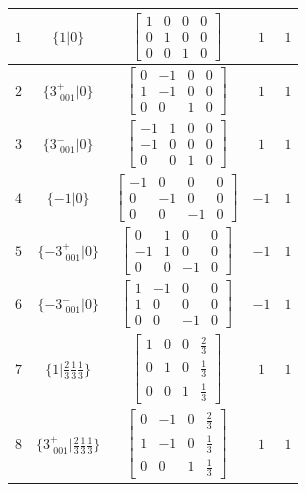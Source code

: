 \documentclass[fleqn,8pt]{jsarticle}
\begin{document}
\begin{longtable}{ccccc}
$ 1 $ & $ \{1|0\} $ & $ \begin{bmatrix} 1 & 0 & 0 & 0 \\ 0 & 1 & 0 & 0 \\ 0 & 0 & 1 & 0 \end{bmatrix} $ & $ 1 $ & $ 1 $ \\ \hline
$ 2 $ & $ \{3^{+}_{\,\,001}|0\} $ & $ \begin{bmatrix} 0 & -1 & 0 & 0 \\ 1 & -1 & 0 & 0 \\ 0 & 0 & 1 & 0 \end{bmatrix} $ & $ 1 $ & $ 1 $ \\ \hline
$ 3 $ & $ \{3^{-}_{\,\,001}|0\} $ & $ \begin{bmatrix} -1 & 1 & 0 & 0 \\ -1 & 0 & 0 & 0 \\ 0 & 0 & 1 & 0 \end{bmatrix} $ & $ 1 $ & $ 1 $ \\ \hline
$ 4 $ & $ \{-1|0\} $ & $ \begin{bmatrix} -1 & 0 & 0 & 0 \\ 0 & -1 & 0 & 0 \\ 0 & 0 & -1 & 0 \end{bmatrix} $ & $ -1 $ & $ 1 $ \\ \hline
$ 5 $ & $ \{-3^{+}_{\,\,001}|0\} $ & $ \begin{bmatrix} 0 & 1 & 0 & 0 \\ -1 & 1 & 0 & 0 \\ 0 & 0 & -1 & 0 \end{bmatrix} $ & $ -1 $ & $ 1 $ \\ \hline
$ 6 $ & $ \{-3^{-}_{\,\,001}|0\} $ & $ \begin{bmatrix} 1 & -1 & 0 & 0 \\ 1 & 0 & 0 & 0 \\ 0 & 0 & -1 & 0 \end{bmatrix} $ & $ -1 $ & $ 1 $ \\ \hline
$ 7 $ & $ \{1|\frac{2}{3} \frac{1}{3} \frac{1}{3}\} $ & $ \begin{bmatrix} 1 & 0 & 0 & \frac{2}{3} \\ 0 & 1 & 0 & \frac{1}{3} \\ 0 & 0 & 1 & \frac{1}{3} \end{bmatrix} $ & $ 1 $ & $ 1 $ \\ \hline
$ 8 $ & $ \{3^{+}_{\,\,001}|\frac{2}{3} \frac{1}{3} \frac{1}{3}\} $ & $ \begin{bmatrix} 0 & -1 & 0 & \frac{2}{3} \\ 1 & -1 & 0 & \frac{1}{3} \\ 0 & 0 & 1 & \frac{1}{3} \end{bmatrix} $ & $ 1 $ & $ 1 $ \\ \hline

\end{longtable}
\end{document}
